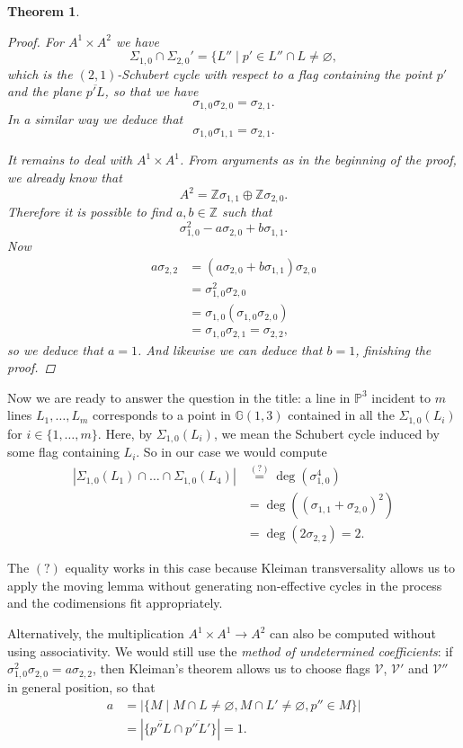 \documentclass[12pt,a4paper]{amsart}
\theoremstyle{plain}
\newtheorem{thm}{Theorem}
\theoremstyle{definition}
\theoremstyle{remark}
\begin{document}
\begin{thm}
\begin{proof}
	For $A^{1}\times A^{2}$ we have
	\[ \Sigma_{1,0}\cap \Sigma_{2,0}'=\{ L''\mid p'\in L''\cap L\neq \varnothing, \]
	which is the $(2,1)$-Schubert cycle with respect to a flag containing the point $p'$ and the plane $\overline{p'L}$, so that we have
	\[ \sigma_{1,0}\sigma_{2,0}=\sigma_{2,1}. \]
	In a similar way we deduce that
	\[ \sigma_{1,0}\sigma_{1,1}=\sigma_{2,1}. \]

	It remains to deal with $A^{1}\times A^{1}$.
	From arguments as in the beginning of the proof, we already know that
	\[ A^{2}=\mathbb{Z}\sigma_{1,1}\oplus \mathbb{Z}\sigma_{2,0}. \]
	Therefore it is possible to find $a,b\in \mathbb{Z}$ such that
	\[ \sigma_{1,0}^{2}-a\sigma_{2,0}+b\sigma_{1,1}. \]
	Now
	\begin{align*}
	    a\sigma_{2,2} & = (a\sigma_{2,0}+b\sigma_{1,1})\sigma_{2,0} \\
	    & = \sigma_{1,0}^{2}\sigma_{2,0} \\
	    & = \sigma_{1,0}(\sigma_{1,0}\sigma_{2,0}) \\
	    & = \sigma_{1,0}\sigma_{2,1} = \sigma_{2,2},
	\end{align*}
	so we deduce that $a=1$.
	And likewise we can deduce that $b=1$, finishing the proof.
    \end{proof}
\end{thm}

Now we are ready to answer the question in the title: a line in $\mathbb{P}^{3}$ incident to $m$ lines $L_{1},\ldots,L_{m}$ corresponds to a point in $\mathbb{G}(1,3)$ contained in all the $\Sigma_{1,0}(L_{i})$ for $i\in \{1,\ldots,m\}$.
Here, by $\Sigma_{1,0}(L_{i})$, we mean the Schubert cycle induced by some flag containing $L_{i}$.
So in our case we would compute
\begin{align*}
    |\Sigma_{1,0}(L_{1})\cap \ldots\cap \Sigma_{1,0}(L_{4})| & \overset{(?)}{=} \deg(\sigma_{1,0}^{4}) \\
    & = \deg((\sigma_{1,1}+\sigma_{2,0})^{2}) \\
    & =\deg(2\sigma_{2,2})=2.
\end{align*}

The $(?)$ equality works in this case because Kleiman transversality allows us to apply the moving lemma without generating non-effective cycles in the process and the codimensions fit appropriately.

Alternatively, the multiplication $A^{1}\times A^{1}\to A^{2}$ can also be computed without using associativity.
We would still use the \textit{method of undetermined coefficients}: if $\sigma_{1,0}^{2}\sigma_{2,0}=a\sigma_{2,2}$, then Kleiman's theorem allows us to choose flags $\mathcal{V}$, $\mathcal{V}'$ and $\mathcal{V}''$ in general position, so that
\begin{align*}
    a & = |\{ M\mid M\cap L\neq \varnothing,M\cap L'\neq \varnothing,p''\in M \} | \\
    & = | \{ \overline{p''L}\cap \overline{p''L'}\}| = 1.
\end{align*}
\end{document}
